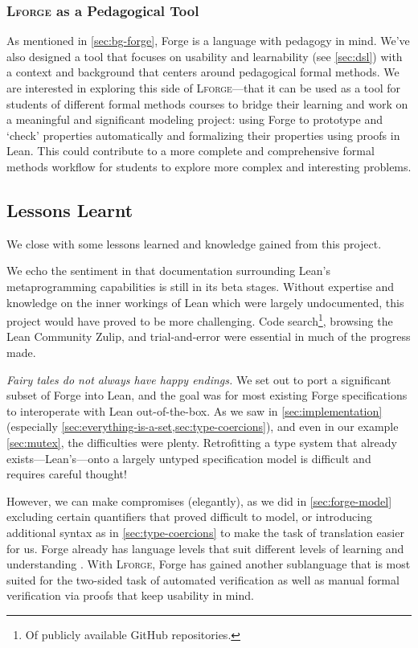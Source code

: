 \subsubsection{\textsc{Lforge} as a Pedagogical Tool}

As mentioned in \cref{sec:bg-forge}, Forge is a language with pedagogy in mind. We've also designed a tool that focuses on usability and learnability (see \cref{sec:dsl}) with a context and background that centers around pedagogical formal methods. We are interested in exploring this side of \textsc{Lforge}---that it can be used as a tool for students of different formal methods courses to bridge their learning and work on a meaningful and significant modeling project: using Forge to prototype and `check' properties automatically and formalizing their properties using proofs in Lean. This could contribute to a more complete and comprehensive formal methods workflow for students to explore more complex and interesting problems. 

\subsection{Lessons Learnt}

We close with some lessons learned and knowledge gained from this project. 

We echo the sentiment in \cite{gladshtein2024small} that documentation surrounding Lean's metaprogramming capabilities is still in its beta stages. Without expertise and knowledge on the inner workings of Lean which were largely undocumented, this project would have proved to be more challenging. Code search\footnote{Of publicly available GitHub repositories.}, browsing the Lean Community Zulip, and trial-and-error were essential in much of the progress made. 

\emph{Fairy tales do not always have happy endings.} We set out to port a significant subset of Forge into Lean, and the goal was for most existing Forge specifications to interoperate with Lean out-of-the-box. As we saw in \cref{sec:implementation} (especially \cref{sec:everything-is-a-set,sec:type-coercions}), and even in our example \cref{sec:mutex}, the difficulties were plenty. Retrofitting a type system that already exists---Lean's---onto a largely untyped specification model is difficult and requires careful thought! 

However, we can make compromises (elegantly), as we did in \cref{sec:forge-model} excluding certain quantifiers that proved difficult to model, or introducing additional syntax as in \cref{sec:type-coercions} to make the task of translation easier for us. Forge already has language levels that suit different levels of learning and understanding \cite{ngpdbccdlrrvwwk-oopsla-2024}. With \textsc{Lforge}, Forge has gained another sublanguage that is most suited for the two-sided task of automated verification as well as manual formal verification via proofs that keep usability in mind. 
